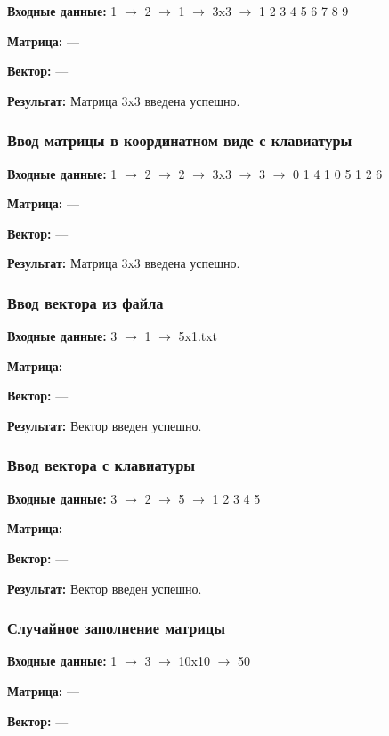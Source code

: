 \documentclass[a4paper,12pt]{extarticle}
\begin{document}
\textbf{Входные данные: }
1 $\rightarrow$ 2 $\rightarrow$ 1 $\rightarrow$ 3x3 $\rightarrow$ 1 2 3 4 5 6 7 8 9

\textbf{Матрица: }
---

\textbf{Вектор: }
---

\textbf{Результат: }
Матрица 3x3 введена успешно.

\subsubsection{Ввод матрицы в координатном виде с клавиатуры}

\textbf{Входные данные: }
1 $\rightarrow$ 2 $\rightarrow$ 2 $\rightarrow$ 3x3 $\rightarrow$ 3 $\rightarrow$ 0 1 4 1 0 5 1 2 6

\textbf{Матрица: }
---

\textbf{Вектор: }
---

\textbf{Результат: }
Матрица 3x3 введена успешно.

\subsubsection{Ввод вектора из файла}

\textbf{Входные данные: }
3 $\rightarrow$ 1 $\rightarrow$ 5x1.txt

\textbf{Матрица: }
---

\textbf{Вектор: }
---

\textbf{Результат: }
Вектор введен успешно.

\subsubsection{Ввод вектора с клавиатуры}

\textbf{Входные данные: }
3 $\rightarrow$ 2 $\rightarrow$ 5 $\rightarrow$ 1 2 3 4 5

\textbf{Матрица: }
---

\textbf{Вектор: }
---

\textbf{Результат: }
Вектор введен успешно.
\subsubsection{Случайное заполнение матрицы}

\textbf{Входные данные: }
1 $\rightarrow$ 3 $\rightarrow$ 10x10 $\rightarrow$ 50

\textbf{Матрица: }
---

\textbf{Вектор: }
---
\end{document}
